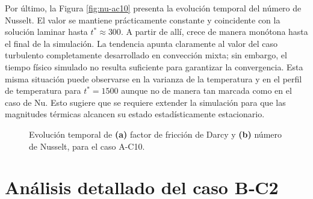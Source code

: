 Por último, la Figura \ref{fig:nu-ac10} presenta la evolución temporal del número de Nusselt. El valor se mantiene prácticamente constante y coincidente con la solución laminar hasta $t^* \approx 300$. A partir de allí, crece de manera monótona hasta el final de la simulación. La tendencia apunta claramente al valor del caso turbulento completamente desarrollado en convección mixta; sin embargo, el tiempo físico simulado no resulta suficiente para garantizar la convergencia. Esta misma situación puede observarse en la varianza de la temperatura y en el perfil de temperatura para $t^*=1500$ aunque no de manera tan marcada como en el caso de Nu. Esto sugiere que se requiere extender la simulación para que las magnitudes térmicas alcancen su estado estadísticamente estacionario.

\begin{figure}[H]
  \centering  
    
  \caption{Evolución temporal de \textbf{(a)} factor de fricción de Darcy y \textbf{(b)} número de Nusselt, para el caso A-C10.}
  \label{fig:ac10-1}
\end{figure}



\newpage
\section{Análisis detallado del caso B‑C2} \label{sec:bc2}

